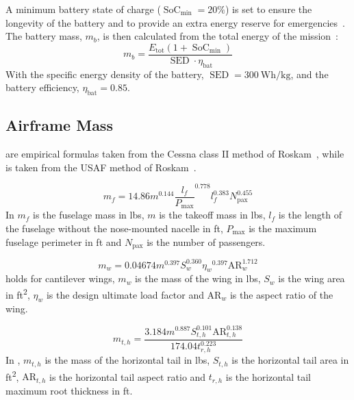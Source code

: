 A minimum battery state of charge ($\operatorname{SoC}_{\min}=20\%$) is set to ensure the longevity of the battery and to provide an extra energy reserve for emergencies~\cite{Ugwueze_Sizing_Method}.
The battery mass, $m_b$, is then calculated from the total energy of the mission~\cite{Ugwueze_Sizing_Method}:
\begin{equation}
    m_b = \frac{E_{\text{tot}}(1+\operatorname{SoC}_{\operatorname{min}})}{\operatorname{SED}\cdot\eta_{\text{bat}}}
\end{equation}
With the specific energy density of the battery, $\operatorname{SED}=\qty{300}{\watt\hour\per\kilo\gram}$, and the battery efficiency, $\eta_{\text{bat}}=0.85$.

\subsection{Airframe Mass}
\label{subsec:Class_II_sizing_Airframe_Mass}

 are empirical formulas taken from the Cessna class II method of Roskam~\cite{Roskam_Part_V}, while  is taken from the USAF method of Roskam~\cite{Roskam_Part_V}.

\begin{equation}
    \label{eq:m_fuselage_classII}
    m_f=14.86 m^{0.144}{\frac{l_f}{P_{\max }}}^{0.778} l_f^{0.383} N_{\text{pax}}^{0.455}
\end{equation}
In  $m_f$ is the fuselage mass in \unit[]{lbs}, $m$ is the takeoff mass in \unit[]{lbs}, $l_f$ is the length of the fuselage without the nose-mounted nacelle in \unit{ft}, $P_{\max}$ is the maximum fuselage perimeter in \unit{ft} and $N_{\text{pax}}$ is the number of passengers.


\begin{equation}
    \label{eq:m_wing_classII}
    m_w=0.04674 m^{0.397} S_w^{0.360} \eta_w{ }^{0.397} \mathrm{AR}_w^{1.712}
\end{equation}
 holds for cantilever wings, $m_w$ is the mass of the wing in \unit[]{lbs}, $S_w$ is the wing area in \unit[]{ft^2}, $\eta_w{ }$ is the design ultimate load factor and $\mathrm{AR}_w$ is the aspect ratio of the wing.


\begin{equation}
    \label{eq:m_horizontal_tail_classII}
    m_{t, h}  =\frac{3.184 m^{0.887} S_{t, h}^{0.101} \mathrm{AR}_{t, h}^{0.138}}{174.04 t_{r, h}^{0.223}}
\end{equation}
In , $ m_{t, h}$ is the mass of the horizontal tail in \unit[]{lbs}, $S_{t, h}$ is the horizontal tail area in \unit{ft^2}, $\mathrm{AR}_{t, h}$ is the horizontal tail aspect ratio and $t_{r, h}$ is the horizontal tail maximum root thickness in \unit{ft}.


